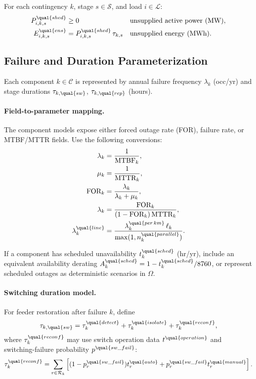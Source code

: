For each contingency \(k\), stage \(s\in\mathcal{S}\), and load \(i\in\mathcal{L}\):
\begin{align}
P^{\qual{shed}}_{i,k,s} &\ge 0 && \text{unsupplied active power (MW)}, \\
E^{\qual{ens}}_{i,k,s} &= P^{\qual{shed}}_{i,k,s}\,\tau_{k,s} && \text{unsupplied energy (MWh)}.
\end{align}

\subsection{Failure and Duration Parameterization}

Each component \(k\in\mathcal{C}\) is represented by annual failure frequency
\(\lambda_k\) (occ/yr) and stage durations
\(\tau_{k,\qual{sw}}\), \(\tau_{k,\qual{rep}}\) (hours).

\paragraph{Field-to-parameter mapping.}
The component models expose either forced outage rate (FOR), failure rate,
or MTBF/MTTR fields. Use the following conversions:
\begin{align}
\lambda_k &= \frac{1}{\text{MTBF}_k}, \\
\mu_k &= \frac{1}{\text{MTTR}_k}, \\
\text{FOR}_k &= \frac{\lambda_k}{\lambda_k + \mu_k}, \\
\lambda_k &= \frac{\text{FOR}_k}{(1-\text{FOR}_k)\,\text{MTTR}_k}, \\
\lambda_k^{\qual{line}} &= \frac{\lambda_k^{\qual{per\,km}}\,\ell_k}{\max(1,n_k^{\qual{parallel}})}.
\end{align}

If a component has scheduled unavailability \(t^{\qual{sched}}_k\) (hr/yr),
include an equivalent availability derating
\(A_k^{\qual{sched}} = 1 - t^{\qual{sched}}_k/8760\), or represent scheduled
outages as deterministic scenarios in \(\Omega\).

\paragraph{Switching duration model.}
For feeder restoration after failure \(k\), define
\begin{align}
\tau_{k,\qual{sw}} = \tau_k^{\qual{detect}} + \tau_k^{\qual{isolate}} + \tau_k^{\qual{reconf}},
\end{align}
where \(\tau_k^{\qual{reconf}}\) may use switch operation data
\(t^{\qual{operation}}\) and switching-failure probability
\(p^{\qual{sw\_fail}}\):
\begin{align}
\tau_k^{\qual{reconf}} = \sum_{r\in\mathcal{R}_k}
\left[(1-p_r^{\qual{sw\_fail}})t_r^{\qual{auto}} + p_r^{\qual{sw\_fail}}t_r^{\qual{manual}}\right].
\end{align}

